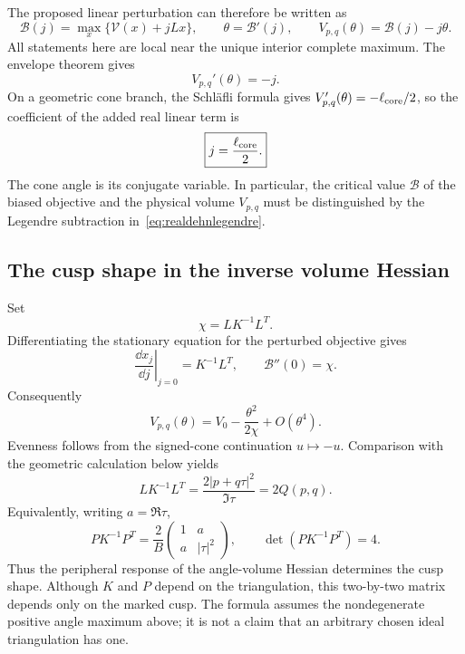 The proposed linear perturbation can therefore be written as
\begin{equation}
 \mathscr B(j)=\max_x\{\mathscr V(x)+jLx\},\qquad
 \theta=\mathscr B'(j),\qquad
 V_{p,q}(\theta)=\mathscr B(j)-j\theta.
 \label{eq:realdehnlegendre}
\end{equation}
All statements here are local near the unique interior complete
maximum. The envelope theorem gives
\[
 V_{p,q}'(\theta)=-j.
\]
On a geometric cone branch, the Schl\"afli formula gives
$V_{p,q}'(\theta)=-\ell_{\rm core}/2$,
so the coefficient of the added real linear term is
\begin{equation}
 \boxed{j=\frac{\ell_{\rm core}}2.}
 \label{eq:dehnsourcecore}
\end{equation}
The cone angle is its conjugate variable. In particular, the
critical value $\mathscr B$ of the biased objective and the physical
volume $V_{p,q}$ must be distinguished by the Legendre subtraction
in~\eqref{eq:realdehnlegendre}.

\subsection{The cusp shape in the inverse volume Hessian}

Set
\[
 \chi=L K^{-1}L^T.
\]
Differentiating the stationary equation for the perturbed objective gives
\[
 \left.\frac{\dd x_j}{\dd j}\right|_{j=0}=K^{-1}L^T,
 \qquad \mathscr B''(0)=\chi.
\]
Consequently
\begin{equation}
 V_{p,q}(\theta)=V_0-\frac{\theta^2}{2\chi}+O(\theta^4).
 \label{eq:dehnquadraticresponse}
\end{equation}
Evenness follows from the signed-cone continuation $u\mapsto-u$.
Comparison with the geometric calculation below yields
\begin{equation}
 \boxed{L K^{-1}L^T=\frac{2|p+q\tau|^2}{\Im\tau}=2Q(p,q).}
 \label{eq:cuspHessian}
\end{equation}
Equivalently, writing $a=\Re\tau$,
\begin{equation}
 \boxed{
 P K^{-1}P^T=\frac2B
  \begin{pmatrix}1&a\\a&|\tau|^2\end{pmatrix},\qquad
 \det(P K^{-1}P^T)=4.}
 \label{eq:cuspmatrixHessian}
\end{equation}
Thus the peripheral response of the angle-volume Hessian determines
the cusp shape. Although $K$ and $P$ depend on the triangulation,
this two-by-two matrix depends only on the marked cusp.
The formula assumes the nondegenerate positive angle maximum above;
it is not a claim that an arbitrary chosen ideal triangulation has one.


